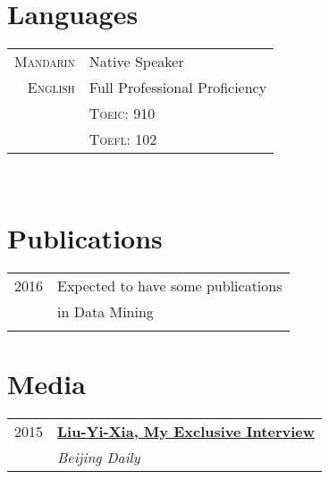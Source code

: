 \documentclass[10pt]{article} %
\begin{document}
{\begin{minipage}[t]{0.44\textwidth}

\section{Languages} 

\begin{tabular}{rl}
\textsc{Mandarin}
& Native Speaker \\
\textsc{English}
& Full Professional Proficiency \\
& \textsc{Toeic}: 910 \\
& \textsc{Toefl}: 102 \\
\end{tabular}\\[10pt]


\section{Publications} 

\begin{tabular}{rl}

2016	 & Expected to have some publications \\
& in Data Mining \\

&\\
\end{tabular}


\section{Media} 

\begin{tabular}{rl}

2015	 & \textbf{\href{http://bjrb.bjd.com.cn/html/2015-12/07/content_335081.htm}{Liu-Yi-Xia, My Exclusive Interview}}\\
& \textit{Beijing Daily}\\


\end{tabular}
\end{minipage}}
\end{document}
